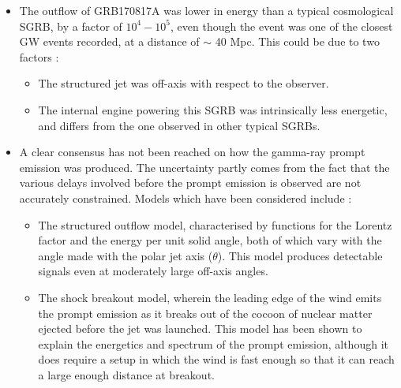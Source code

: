     \begin{itemize}

        \item The outflow of GRB170817A was lower in energy than a typical cosmological
            SGRB, by a factor of $10^4 - 10^5$, even though the event was one of the
            closest GW events recorded, at a distance of $\sim$ 40 Mpc. This could be
            due to two factors :

            \begin{itemize}

                \item The structured jet was off-axis with respect to the observer.

                \item The internal engine powering this SGRB was intrinsically less
                    energetic, and differs from the one observed in other typical SGRBs.

            \end{itemize}

        \item A clear consensus has not been reached on how the gamma-ray prompt
            emission was produced. The uncertainty partly comes from the fact that the
            various delays involved before the prompt emission is observed are not
            accurately constrained. Models which have been considered include :

            \begin{itemize}

                \item The structured outflow model, characterised by functions for the
                    Lorentz factor and the energy per unit solid angle, both of which
                    vary with the angle made with the polar jet axis ($\theta$). This
                    model produces detectable signals even at moderately large off-axis
                    angles.

                \item The shock breakout model, wherein the leading edge of the wind
                    emits the prompt emission as it breaks out of the cocoon of nuclear
                    matter ejected before the jet was launched. This model has been
                    shown to explain the energetics and spectrum of the prompt emission,
                    although it does require a setup in which the wind is fast enough so
                    that it can reach a large enough distance at breakout.

            \end{itemize}

    \end{itemize}

